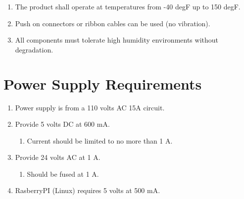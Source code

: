 \documentclass[12pt,letterpaper]{article}
\begin{document}
\begin{enumerate}
\item The product shall operate at temperatures from -40 degF
		up to 150 degF.
\item Push on connectors or ribbon cables can be used (no vibration).
\item All components must tolerate high humidity environments without
	degradation.
\end{enumerate}

\section{Power Supply Requirements}

\begin{enumerate}
	\item Power supply is from a 110 volts AC 15A circuit.
	\item Provide 5 volts DC at 600 mA.
	\begin{enumerate}
		\item Current should be limited to no more than 1 A.
	\end{enumerate}
	\item Provide 24 volts AC at 1 A.
	\begin{enumerate}
		\item Should be fused at 1 A.
	\end{enumerate}
	\item RasberryPI (Linux) requires 5 volts at 500 mA.
\end{enumerate}


\pagebreak
\printbibliography[heading=bibintoc]
\end{document}
